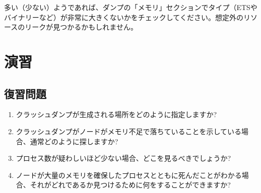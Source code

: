 多い（少ない）ようであれば、ダンプの「メモリ」セクションでタイプ（ETSやバイナリーなど）が非常に大きくないかをチェックしてください。想定外のリソースのリークが見つかるかもしれません。

\section{演習}

\subsection*{復習問題}

\begin{enumerate}
	\item クラッシュダンプが生成される場所をどのように指定しますか?
	\item クラッシュダンプがノードがメモリ不足で落ちていることを示している場合、通常どのように探しますか?
	\item プロセス数が疑わしいほど少ない場合、どこを見るべきでしょうか?
	\item ノードが大量のメモリを確保したプロセスとともに死んだことがわかる場合、それがどれであるか見つけるために何をすることができますか?\end{enumerate}

